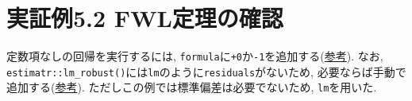 \documentclass[
]{book}
\begin{document}
\hypertarget{ux5b9fux8a3cux4f8b5.2-fwlux5b9aux7406ux306eux78baux8a8d}{%
\section*{実証例5.2 FWL定理の確認}\label{ux5b9fux8a3cux4f8b5.2-fwlux5b9aux7406ux306eux78baux8a8d}}

定数項なしの回帰を実行するには, \texttt{formula}に\texttt{+0}か\texttt{-1}を追加する(\href{https://indenkun.hatenablog.com/entry/2020/02/29/013000}{参考}). なお, \texttt{estimatr::lm\_robust()}には\texttt{lm}のように\texttt{residuals}がないため, 必要ならば手動で追加する(\href{https://stackoverflow.com/questions/74577781/extract-residuals-from-heteroskedasticity-robust-standard-model-lm-robust}{参考}). ただしこの例では標準偏差は必要でないため, \texttt{lm}を用いた.
\end{document}
